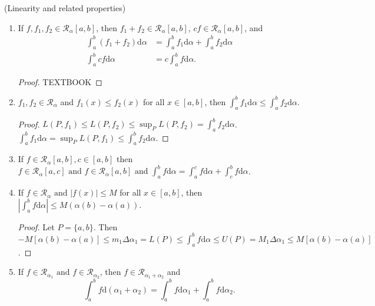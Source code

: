 \begin{thm}[12](Linearity and related properties)
	\begin{enumerate}
		\item If $f,f_1,f_2 \in \mathscr{R}_{\alpha}[a,b]$, then $f_1+f_2 \in \mathscr{R}_{\alpha}[a,b]$, $cf \in \mathscr{R}_{\alpha}[a,b]$, and
		      \begin{align*}
			      \int_{a}^{b}{(f_1+f_2)\mathrm{d}\alpha} & =\int_{a}^{b}{f_1\mathrm{d}\alpha}+\int_{a}^{b}{f_2\mathrm{d}\alpha} \\
			      \int_{a}^{b}{c f\mathrm{d}\alpha}       & =c\int_{a}^{b}{f\mathrm{d}\alpha}.
		      \end{align*}
		      \begin{proof}
			      TEXTBOOK
		      \end{proof}
		\item $f_1,f_2 \in \mathscr{R}_{\alpha}$ and $f_1(x)\le f_2(x)$ for all $x \in [a,b]$, then $\int_{a}^{b}{f_1\mathrm{d}\alpha}\le \int_{a}^{b}{f_2\mathrm{d}\alpha}$.
		      \begin{proof}
			      $L(P,f_1)\le L(P,f_2)\le \sup_P L(P,f_2)=\int_{a}^{b}{f_2\mathrm{d}\alpha}$.
			      $\int_{a}^{b}{f_1\mathrm{d}\alpha}=\sup_{P}L(P,f_1)\le  \int_{a}^{b}{f_2\mathrm{d}\alpha}$.
		      \end{proof}
		\item If $f \in \mathscr{R}_{\alpha}[a,b], c \in [a,b]$ then $f \in \mathscr{R}_{\alpha}[a,c] \text{ and } f \in \mathscr{R}_{\alpha}[a,b] \text{ and }  \int_{a}^{b}{f\mathrm{d}\alpha}=\int_{a}^{c}{f\mathrm{d}\alpha}+\int_{c}^{b}{f\mathrm{d}\alpha}$.
		\item If $f \in \mathscr{R}_{\alpha} \text{ and }  |f(x)|\le M$ for all $x \in [a,b]$, then $|\int_{a}^{b}{f\mathrm{d}\alpha}|\le M(\alpha(b)-\alpha(a))$.
		      \begin{proof}
			      Let $P=\{a,b\}$. Then $-M[\alpha(b)-\alpha(a)]\le m_1 \Delta \alpha_1=L(P)\le \int_{a}^{b}{f\mathrm{d}\alpha}\le U(P)=M_1 \Delta \alpha_1\le M [\alpha(b)-\alpha(a)]$.
		      \end{proof}
		\item If $f \in \mathscr{R}_{\alpha_1} \text{ and }  f \in \mathscr{R}_{\alpha_2}$, then $f \in \mathscr{R}_{\alpha_1+\alpha_2}$ and
		      \begin{equation*}
			      \label{eq:s}
			      \int_{a}^{b}{f\mathrm{d}(\alpha_1+\alpha_2)}=\int_{a}^{b}{f\mathrm{d}\alpha_1}+\int_{a}^{b}{f\mathrm{d}\alpha_2} \tag{*}.
		      \end{equation*}\\

\end{enumerate}
\end{thm}

